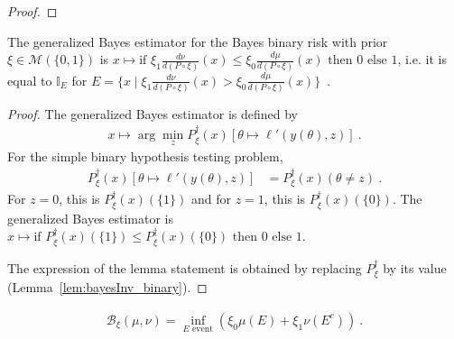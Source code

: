 \begin{proof}\leanok
\uses{}

\end{proof}


\begin{lemma}
  \label{lem:genBayesEstimator_bayesBinaryRisk}
  \leanok
  The generalized Bayes estimator for the Bayes binary risk with prior $\xi \in \mathcal M(\{0,1\})$ is $x \mapsto \text{if } \xi_1\frac{d \nu}{d(P \circ \xi)}(x) \le \xi_0\frac{d \mu}{d(P \circ \xi)}(x) \text{ then } 0 \text{ else } 1$, i.e. it is equal to $\mathbb{I}_E$ for $E = \{x \mid \xi_1\frac{d \nu}{d(P \circ \xi)}(x) > \xi_0\frac{d \mu}{d(P \circ \xi)}(x)\}$~.
\end{lemma}

\begin{proof}\leanok
{}
The generalized Bayes estimator is defined by
\begin{align*}
x \mapsto \arg\min_z P_\xi^\dagger(x)\left[\theta \mapsto \ell'(y(\theta), z)\right] \: .
\end{align*}
For the simple binary hypothesis testing problem,
\begin{align*}
P_\xi^\dagger(x)\left[\theta \mapsto \ell'(y(\theta), z)\right]
&= P_\xi^\dagger(x)(\theta \ne z)
\: .
\end{align*}
For $z = 0$, this is $P_\xi^\dagger(x)(\{1\})$ and for $z = 1$, this is $P_\xi^\dagger(x)(\{0\})$.
The generalized Bayes estimator is $x \mapsto \text{if } P_\xi^\dagger(x)(\{1\}) \le P_\xi^\dagger(x)(\{0\}) \text{ then } 0 \text{ else } 1$.

The expression of the lemma statement is obtained by replacing $P_\xi^\dagger$ by its value (Lemma~\ref{lem:bayesInv_binary}).
\end{proof}


\begin{lemma}
  \label{lem:bayesBinaryRisk_eq_event}
  \leanok
  \begin{align*}
  \mathcal B_\xi(\mu, \nu) = \inf_{E \text{ event}} \left( \xi_0 \mu(E) + \xi_1 \nu(E^c) \right) \: .
  \end{align*}
\end{lemma}

